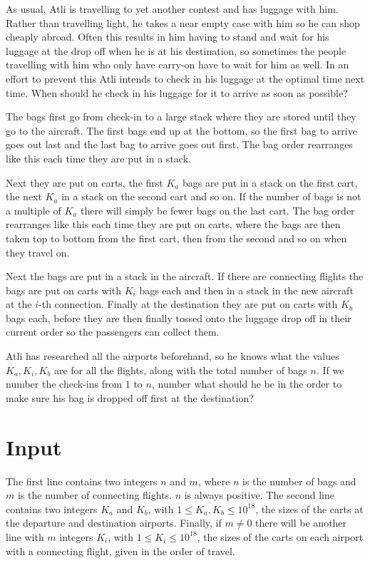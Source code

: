 
As usual, Atli is travelling to yet another contest and has luggage with him. Rather than travelling light, he takes a near empty case with him so he can shop
cheaply abroad. Often this results in him having to stand and wait for his luggage at the drop off when he is at his destination, so sometimes the
people travelling with him who only have carry-on have to wait for him as well. In an effort to prevent this Atli intends to check in his luggage
at the optimal time next time. When should he check in his luggage for it to arrive as soon as possible?

The bags first go from check-in to a large stack where they are stored until they go to the aircraft. The first bags end up at the bottom, so the
first bag to arrive goes out last and the last bag to arrive goes out first. The bag order rearranges like this each time they are put in a stack.

Next they are put on carts, the first $K_a$ bags are put in a stack on the first cart, the next $K_a$ in a stack on the second cart and so on.
If the number of bags is not a multiple of $K_a$ there will simply be fewer bags on the last cart. The bag order rearranges like this each time
they are put on carts, where the bags are then taken top to bottom from the first cart, then from the second and so on when they travel on.

Next the bags are put in a stack in the aircraft. If there are connecting flights the bags are put on carts with $K_i$ bags each and then in 
a stack in the new aircraft at the $i$-th connection. Finally at the destination they are put on carts with $K_b$ bags each,
before they are then finally tossed onto the luggage drop off in their current order so the passengers can collect them.

Atli has researched all the airports beforehand, so he knows what the values $K_a, K_i, K_b$ are for all the flights, along with the total
number of bags $n$. If we number the check-ins from $1$ to $n$, number what should he be in the order to make sure his bag is dropped off
first at the destination?

\section*{Input}
The first line contains two integers $n$ and $m$, where $n$ is the number of bags and $m$ is the number of connecting flights.
$n$ is always positive. The second line contains two integers $K_a$ and $K_b$, with $1 \leq K_a, K_b \leq 10^{18}$, the sizes of the carts
at the departure and destination airports. Finally, if $m \neq 0$ there will be another line with $m$ integers $K_i$, with $1 \leq K_i \leq 10^{18}$,
the sizes of the carts on each airport with a connecting flight, given in the order of travel.


